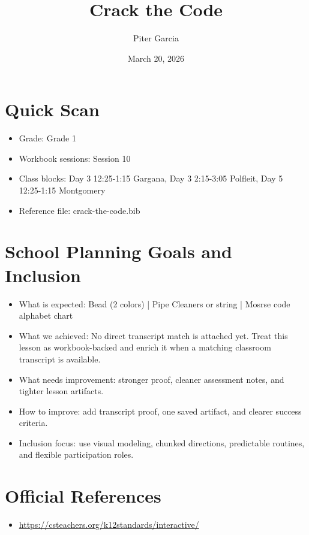 \documentclass[11pt]{article}
\title{Crack the Code}
\author{Piter Garcia}
\date{March 20, 2026}
\begin{document}
\maketitle
\section*{Quick Scan}
\begin{itemize}[leftmargin=*]
\item Grade: Grade 1
\item Workbook sessions: Session 10
\item Class blocks: Day 3 12:25-1:15 Gargana, Day 3 2:15-3:05 Polfleit, Day 5 12:25-1:15 Montgomery
\item Reference file: crack-the-code.bib
\end{itemize}
\section*{School Planning Goals and Inclusion}
\begin{itemize}[leftmargin=*]
\item What is expected: Bead (2 colors) | Pipe Cleaners or string | Mosrse code alphabet chart
\item What we achieved: No direct transcript match is attached yet. Treat this lesson as workbook-backed and enrich it when a matching classroom transcript is available.
\item What needs improvement: stronger proof, cleaner assessment notes, and tighter lesson artifacts.
\item How to improve: add transcript proof, one saved artifact, and clearer success criteria.
\item Inclusion focus: use visual modeling, chunked directions, predictable routines, and flexible participation roles.
\end{itemize}
\section*{Official References}
\begin{itemize}[leftmargin=*]
\item \url{https://csteachers.org/k12standards/interactive/}

\end{itemize}
\end{document}

